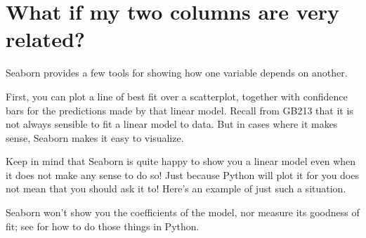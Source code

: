 \documentclass[letterpaper,10pt,english]{sphinxmanual}
\begin{document}
\noindent{}


\section{What if my two columns are very related?}
\label{\detokenize{chapter-10-visualization:what-if-my-two-columns-are-very-related}}
Seaborn provides a few tools for showing how one variable depends on another.

First, you can plot a line of best fit over a scatterplot, together with confidence bars for the predictions made by that linear model.  Recall from GB213 that it is not always sensible to fit a linear model to data.  But in cases where it makes sense, Seaborn makes it easy to visualize.

Keep in mind that Seaborn is quite happy to show you a linear model even when it does not make any sense to do so!  Just because Python will plot it for you does not mean that you should ask it to!  Here’s an example of just such a situation.

\begin{sphinxVerbatim}[commandchars=\\\{\}]
    
 
          
          
               
\end{sphinxVerbatim}

\noindent{}

Seaborn won’t show you the coefficients of the model, nor measure its goodness of fit; see {\hyperref[\detokenize{GB213-review-in-Python::doc}]{}} for how to do those things in Python.
\end{document}
